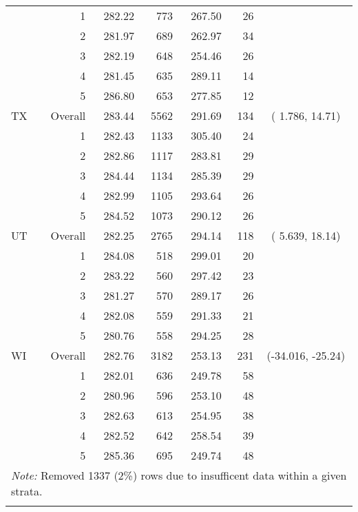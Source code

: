 \begin{longtable}{lrrr@{\extracolsep{.25cm}}rrc}
   & 1 & 282.22 & 773 & 267.50 &  26 &  \\ 
   & 2 & 281.97 & 689 & 262.97 &  34 &  \\ 
   & 3 & 282.19 & 648 & 254.46 &  26 &  \\ 
   & 4 & 281.45 & 635 & 289.11 &  14 &  \\ 
   & 5 & 286.80 & 653 & 277.85 &  12 &  \\ 
   \hline
TX & Overall & 283.44 & 5562 & 291.69 & 134 & (  1.786,  14.71) \\ 
   & 1 & 282.43 & 1133 & 305.40 &  24 &  \\ 
   & 2 & 282.86 & 1117 & 283.81 &  29 &  \\ 
   & 3 & 284.44 & 1134 & 285.39 &  29 &  \\ 
   & 4 & 282.99 & 1105 & 293.64 &  26 &  \\ 
   & 5 & 284.52 & 1073 & 290.12 &  26 &  \\ 
   \hline
UT & Overall & 282.25 & 2765 & 294.14 & 118 & (  5.639,  18.14) \\ 
   & 1 & 284.08 & 518 & 299.01 &  20 &  \\ 
   & 2 & 283.22 & 560 & 297.42 &  23 &  \\ 
   & 3 & 281.27 & 570 & 289.17 &  26 &  \\ 
   & 4 & 282.08 & 559 & 291.33 &  21 &  \\ 
   & 5 & 280.76 & 558 & 294.25 &  28 &  \\ 
   \hline
WI & Overall & 282.76 & 3182 & 253.13 & 231 & (-34.016, -25.24) \\ 
   & 1 & 282.01 & 636 & 249.78 &  58 &  \\ 
   & 2 & 280.96 & 596 & 253.10 &  48 &  \\ 
   & 3 & 282.63 & 613 & 254.95 &  38 &  \\ 
   & 4 & 282.52 & 642 & 258.54 &  39 &  \\ 
   & 5 & 285.36 & 695 & 249.74 &  48 &  \\ 
   \hline \multicolumn{7}{l}{\textit{Note:} Removed 1337 (2\%) rows due to insufficent data within a given strata.} \\\hline
\label{g8math-mlpsa-lrAIC}
\end{longtable}
